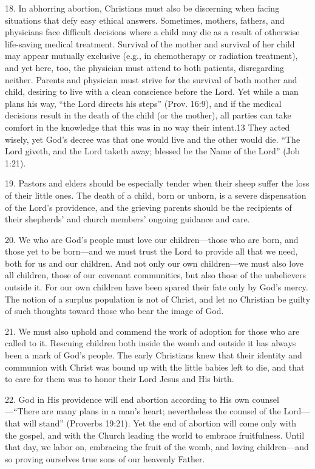 \documentclass[
]{book}
\begin{document}
18. In abhorring abortion, Christians must also be discerning when facing situations that defy easy ethical answers. Sometimes, mothers, fathers, and physicians face difficult decisions where a child may die as a result of otherwise life-saving medical treatment. Survival of the mother and survival of her child may appear mutually exclusive (e.g., in chemotherapy or radiation treatment), and yet here, too, the physician must attend to both patients, disregarding neither. Parents and physician must strive for the survival of both mother and child, desiring to live with a clean conscience before the Lord. Yet while a man plans his way, ``the Lord directs his steps'' (Prov. 16:9), and if the medical decisions result in the death of the child (or the mother), all parties can take comfort in the knowledge that this was in no way their intent.13 They acted wisely, yet God's decree was that one would live and the other would die. ``The Lord giveth, and the Lord taketh away; blessed be the Name of the Lord'' (Job 1:21).

19. Pastors and elders should be especially tender when their sheep suffer the loss of their little ones. The death of a child, born or unborn, is a severe dispensation of the Lord's providence, and the grieving parents should be the recipients of their shepherds' and church members' ongoing guidance and care.

20. We who are God's people must love our children---those who are born, and those yet to be born---and we must trust the Lord to provide all that we need, both for us and our children. And not only our own children---we must also love all children, those of our covenant communities, but also those of the unbelievers outside it. For our own children have been spared their fate only by God's mercy. The notion of a surplus population is not of Christ, and let no Christian be guilty of such thoughts toward those who bear the image of God.

21. We must also uphold and commend the work of adoption for those who are called to it. Rescuing children both inside the womb and outside it has always been a mark of God's people. The early Christians knew that their identity and communion with Christ was bound up with the little babies left to die, and that to care for them was to honor their Lord Jesus and His birth.

22. God in His providence will end abortion according to His own counsel---``There are many plans in a man's heart; nevertheless the counsel of the Lord---that will stand'' (Proverbs 19:21). Yet the end of abortion will come only with the gospel, and with the Church leading the world to embrace fruitfulness. Until that day, we labor on, embracing the fruit of the womb, and loving children---and so proving ourselves true sons of our heavenly Father.
\end{document}
